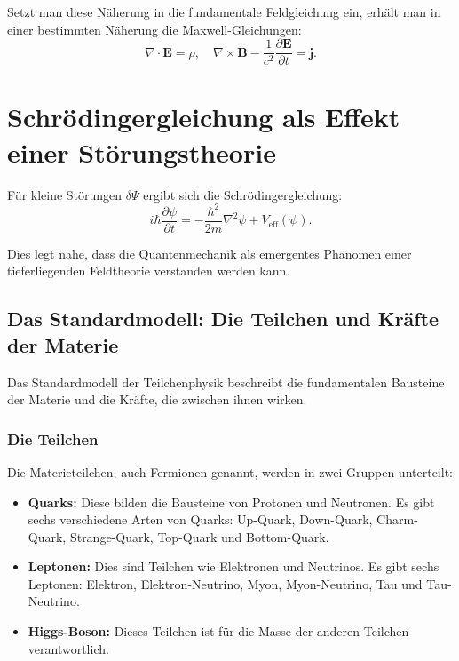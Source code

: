 \documentclass{article}
\begin{document}
	Setzt man diese Näherung in die fundamentale Feldgleichung ein, erhält man in einer bestimmten Näherung die Maxwell-Gleichungen:
	\begin{equation}
		\nabla \cdot \mathbf{E} = \rho, \quad \nabla \times \mathbf{B} - \frac{1}{c^2} \frac{\partial \mathbf{E}}{\partial t} = \mathbf{j}.
	\end{equation}
	
	\section{Schrödingergleichung als Effekt einer Störungstheorie}
	Für kleine Störungen $\delta \Psi$ ergibt sich die Schrödingergleichung:
	\begin{equation}
		i \hbar \frac{\partial \psi}{\partial t} = -\frac{\hbar^2}{2m} \nabla^2 \psi + V_{\text{eff}}(\psi).
	\end{equation}
	
	Dies legt nahe, dass die Quantenmechanik als emergentes Phänomen einer tieferliegenden Feldtheorie verstanden werden kann.
\subsection{Das Standardmodell: Die Teilchen und Kräfte der Materie}

Das Standardmodell der Teilchenphysik beschreibt die fundamentalen Bausteine der Materie und die Kräfte, die zwischen ihnen wirken.

\subsubsection{Die Teilchen}

Die Materieteilchen, auch Fermionen genannt, werden in zwei Gruppen unterteilt:

\begin{itemize}
	\item \textbf{Quarks:} Diese bilden die Bausteine von Protonen und Neutronen. Es gibt sechs verschiedene Arten von Quarks: Up-Quark, Down-Quark, Charm-Quark, Strange-Quark, Top-Quark und Bottom-Quark.
	\item \textbf{Leptonen:} Dies sind Teilchen wie Elektronen und Neutrinos. Es gibt sechs Leptonen: Elektron, Elektron-Neutrino, Myon, Myon-Neutrino, Tau und Tau-Neutrino.
	\item \textbf{Higgs-Boson:} Dieses Teilchen ist für die Masse der anderen Teilchen verantwortlich.
\end{itemize}
\end{document}
